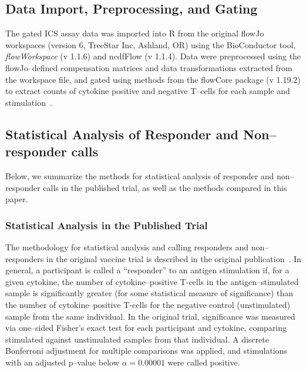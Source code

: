 \documentclass[11pt]{article}
\begin{document}
 


\subsection{Data Import, Preprocessing, and Gating}
The gated ICS assay data was imported into R from the original flowJo workspaces (version 6, TreeStar Inc, Ashland, OR)  using the BioConductor tool, \textit{flowWorkspace} (v 1.1.6) and ncdfFlow (v 1.1.4). Data were preprocessed using the flowJo--defined compensation matrices and data transformations extracted from the workspace file, and gated using methods from the flowCore package (v 1.19.2) to extract counts of cytokine positive and negative T--cells for each sample and stimulation~\cite{Hahne:2009vv}.

\subsection{Statistical Analysis of Responder and Non--responder calls}
Below, we summarize the methods for statistical analysis of responder and non--responder calls in the published trial, as well as the methods compared in this paper.
\subsubsection{Statistical Analysis in the Published Trial}
The methodology for statistical analysis and calling responders and non--responders in the original vaccine trial is described in the original publication~\cite{Peiperl:2010ej}. In general, a participant is called a ``responder'' to an antigen stimulation if, for a given cytokine, the number of cytokine--positive T-cells in the antigen--stimulated sample is significantly greater (for some statistical measure of significance) than the number of cytokine--positive T-cells for the negative control (unstimulated) sample from the same individual. In the original trial, significance was measured via one--sided Fisher's exact test for each participant and cytokine, comparing stimulated against unstimulated samples from that individual. A discrete Bonferroni adjustment for multiple comparisons was applied, and stimulations with an adjusted p--value below $\alpha = 0.00001$ were called positive. 
\end{document}
